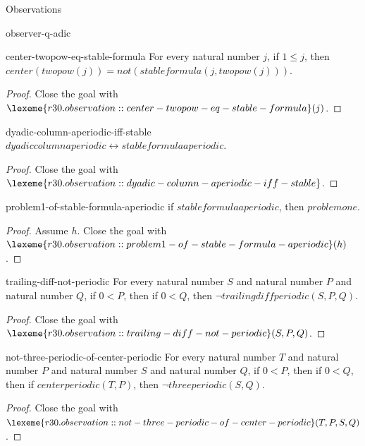 \begin{lexlean}{Observations}
\begin{section}{observer-q-adic}
\begin{theorem}{center-twopow-eq-stable-formula}
For every natural number \(j\), if \(1 ≤ j\), then \(center(twopow(j)) = not(stableformula(j, twopow(j)))\).
\begin{proof}
Close the goal with \(\lexeme{r30.observation::center-twopow-eq-stable-formula}(j)\).
\end{proof}
\end{theorem}

\begin{theorem}{dyadic-column-aperiodic-iff-stable}
\(dyadiccolumnaperiodic ↔ stableformulaaperiodic\).
\begin{proof}
Close the goal with \(\lexeme{r30.observation::dyadic-column-aperiodic-iff-stable}\).
\end{proof}
\end{theorem}

\begin{theorem}{problem1-of-stable-formula-aperiodic}
if \(stableformulaaperiodic\), then \(problemone\).
\begin{proof}
Assume \(h\).
Close the goal with \(\lexeme{r30.observation::problem1-of-stable-formula-aperiodic}(h)\).
\end{proof}
\end{theorem}

\begin{theorem}{trailing-diff-not-periodic}
For every natural number \(S\) and natural number \(P\) and natural number \(Q\), if \(0 < P\), then if \(0 < Q\), then \(¬ trailingdiffperiodic(S, P, Q)\).
\begin{proof}
Close the goal with \(\lexeme{r30.observation::trailing-diff-not-periodic}(S, P, Q)\).
\end{proof}
\end{theorem}

\begin{theorem}{not-three-periodic-of-center-periodic}
For every natural number \(T\) and natural number \(P\) and natural number \(S\) and natural number \(Q\), if \(0 < P\), then if \(0 < Q\), then if \(centerperiodic(T, P)\), then \(¬ threeperiodic(S, Q)\).
\begin{proof}
Close the goal with \(\lexeme{r30.observation::not-three-periodic-of-center-periodic}(T, P, S, Q)\).
\end{proof}
\end{theorem}


\end{section}
\end{lexlean}
